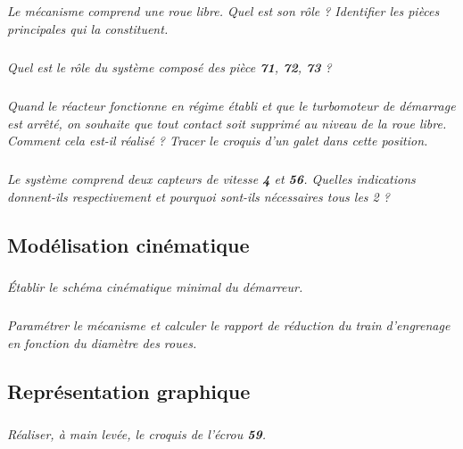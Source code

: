 \documentclass[10pt]{article}
\begin{document}
\subparagraph{}
\textit{Le mécanisme comprend une roue libre. Quel est son rôle ? Identifier les pièces principales qui la constituent.}

\subparagraph{}
\textit{Quel est le rôle du système composé des pièce \textbf{71}, \textbf{72}, \textbf{73} ?}

\subparagraph{}
\textit{Quand le réacteur fonctionne en régime établi et que le turbomoteur de démarrage est arrêté, on souhaite que tout contact soit supprimé au niveau de la roue libre. Comment cela est-il réalisé ? Tracer le croquis d'un galet dans cette position.}

\subparagraph{}
\textit{Le système comprend deux capteurs de vitesse \textbf{4} et \textbf{56}. Quelles indications donnent-ils respectivement et pourquoi sont-ils nécessaires tous les 2 ?}


\subsection*{Modélisation cinématique}

\subparagraph{}
\textit{Établir le schéma cinématique minimal du démarreur. }


\subparagraph{}
\textit{Paramétrer le mécanisme et calculer le rapport de réduction du train d'engrenage en fonction du diamètre des roues. }

\subsection*{Représentation graphique}

\subparagraph{}
\textit{Réaliser, à main levée, le croquis de l'écrou \textbf{59}.}
\end{document}
